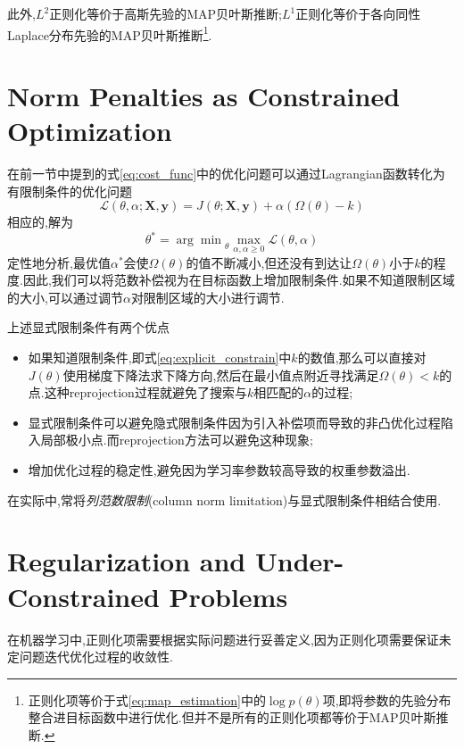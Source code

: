 此外,$L^2$正则化等价于高斯先验的MAP贝叶斯推断;$L^1$正则化等价于各向同性Laplace分布先验的MAP贝叶斯推断\footnote{正则化项等价于式\ref{eq:map_estimation}中的$\log p(\theta)$项,即将参数的先验分布整合进目标函数中进行优化.但并不是所有的正则化项都等价于MAP贝叶斯推断.}.

\section{Norm Penalties as Constrained Optimization}

在前一节中提到的式\ref{eq:cost_func}中的优化问题可以通过Lagrangian函数转化为有限制条件的优化问题
\begin{equation}\label{eq:explicit_constrain}
\mathcal L(\theta,\alpha;\mathbf{X,y})=J(\theta;\mathbf{X,y})+\alpha(\Omega(\theta)-k)
\end{equation}
相应的,解为
\begin{equation}
\theta^\ast={\arg\min}_\theta\max_{\alpha,\alpha\ge 0}\mathcal L(\theta,\alpha)
\end{equation}
定性地分析,最优值$\alpha^\ast$会使$\Omega(\theta)$的值不断减小,但还没有到达让$\Omega(\theta)$小于$k$的程度.因此,我们可以将范数补偿视为在目标函数上增加限制条件.如果不知道限制区域的大小,可以通过调节$\alpha$对限制区域的大小进行调节.

上述显式限制条件有两个优点
\begin{itemize}
    \item 如果知道限制条件,即式\ref{eq:explicit_constrain}中$k$的数值,那么可以直接对$J(\theta)$使用梯度下降法求下降方向,然后在最小值点附近寻找满足$\Omega(\theta)<k$的点.这种reprojection过程就避免了搜索与$k$相匹配的$\alpha$的过程;
    \item 显式限制条件可以避免隐式限制条件因为引入补偿项而导致的非凸优化过程陷入局部极小点.而reprojection方法可以避免这种现象;
    \item 增加优化过程的稳定性,避免因为学习率参数较高导致的权重参数溢出.
\end{itemize}

在实际中,常将\textit{列范数限制}(column norm limitation)与显式限制条件相结合使用.

\section{Regularization and Under-Constrained Problems}

在机器学习中,正则化项需要根据实际问题进行妥善定义,因为正则化项需要保证未定问题迭代优化过程的收敛性.

